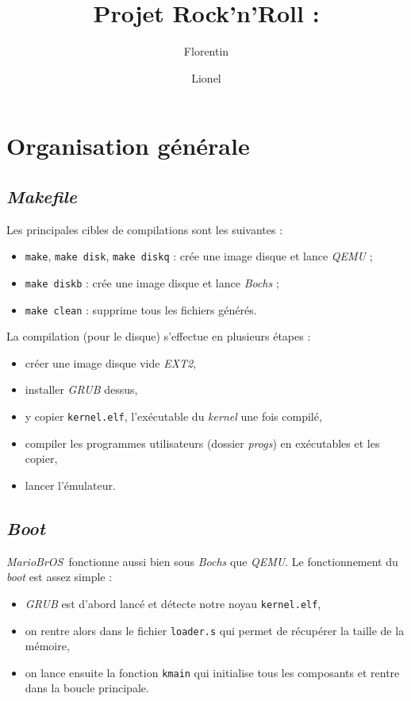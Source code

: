 \documentclass[a4paper, 10pt, french]{article}
\title{Projet Rock'n'Roll : \mariobros}
\author{Florentin \bsc{Guth} \and Lionel \bsc{Zoubritzky}}
\newcommand{\source}[5]{
  \begin{table}[H]
    \centering
    \small
\inputminted[frame=lines,linenos,style=colorful,fontfamily=tt,breaklines,
autogobble,firstline=#3,firstnumber=#3,lastline=#4,label={#2[#3--#4]}]{#1
}{../src/#2}
    
\captionsetup{name=Listing,labelformat=listing,labelsep=endash,labelfont={sc}}
    \caption{#5}
  \end{table}
  }
\newcommand{\codeC}[1]{\texttt{#1}}
\newcommand{\code}[1]{\texttt{#1}}
\newcommand{\foreign}[1]{\emph{#1}}
\newcommand{\mariobros}{\foreign{MarioBrOS}}
\begin{document}
\maketitle


\tableofcontents

\clearpage

%
% 
% 
% 

\section{Organisation générale}

\subsection{\foreign{Makefile}}

Les principales cibles de compilations sont les suivantes :
\begin{itemize}
 \item \code{make}, \code{make disk}, \code{make diskq} : crée une image disque 
et lance \foreign{QEMU} ;
 \item \code{make diskb} : crée une image disque et lance \foreign{Bochs} ;
 \item \code{make clean} : supprime tous les fichiers générés.
\end{itemize}

La compilation (pour le disque) s'effectue en plusieurs étapes :
\begin{itemize}
 \item créer une image disque vide \foreign{EXT2},
 \item installer \foreign{GRUB} dessus,
 \item y copier \code{kernel.elf}, l'exécutable du \foreign{kernel} une fois 
compilé,
 \item compiler les programmes utilisateurs (dossier \foreign{progs}) en 
exécutables et les copier,
 \item lancer l'émulateur.
\end{itemize}



\subsection{\foreign{Boot}}

\mariobros\ fonctionne aussi bien sous \foreign{Bochs} que \foreign{QEMU}. Le 
fonctionnement du \foreign{boot} est assez simple :
\begin{itemize}
 \item \foreign{GRUB} est d'abord lancé et détecte notre noyau 
\code{kernel.elf},
 \item on rentre alors dans le fichier \code{loader.s} qui permet de récupérer 
la taille de la mémoire,
 \item on lance ensuite la fonction \code{kmain} qui initialise tous les 
composants et rentre dans la boucle principale.
\end{itemize}
\end{document}
